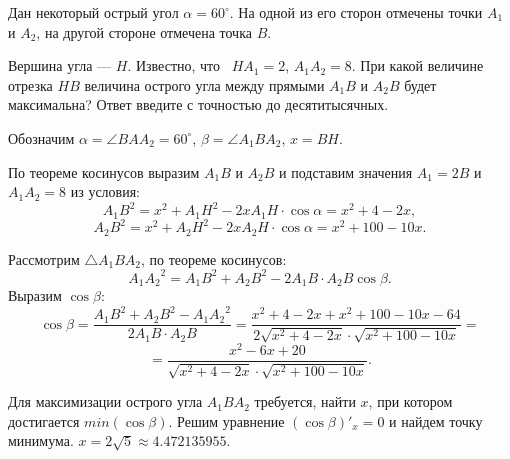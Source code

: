 
Дан некоторый острый угол $\alpha = 60^{\circ}$. На одной из его сторон отмечены точки $A_1$ и $A_2$, на другой стороне отмечена точка $B$. 

Вершина угла — $H$. Известно, что  $HA_1=2$, $A_1A_2=8$. При какой величине отрезка $HB$ величина острого угла между прямыми $A_1B$ и $A_2B$  будет максимальна? Ответ введите с точностью до десятитысячных.

\solutionSection

Обозначим $\alpha = \angle BAA_2=60^{\circ}$, $\beta = \angle A_1BA_2$, $x = BH$. 


По теореме косинусов выразим $A_1B$ и $A_2B$ и подставим значения $A_1 = 2B$ и $A_1A_2 = 8$ из условия:
$$A_1B^2 = x^2 + A_1H^2 - 2xA_1H\cdot \cos\alpha = x^2 + 4 - 2x,$$
$$A_2B^2 = x^2 + A_2H^2 - 2xA_2H\cdot \cos\alpha = x^2 + 100 - 10x.$$

Рассмотрим $\triangle A_1BA_2$, по теореме косинусов:
$${A_1A_2}^2 = A_1B^2 + A_2B^2 - 2A_1B\cdot A_2B \cos\beta.$$
Выразим $\cos\beta$:
$$\cos\beta = \frac{A_1B^2 + A_2B^2 - {A_1A_2}^2}{2A_1B\cdot A_2B} = \frac{x^2 + 4 - 2x + x^2 + 100 - 10x - 64}{2\sqrt{x^2 + 4 - 2x} \cdot \sqrt{x^2 + 100 - 10x}} =  $$
$$=\frac{x^2 - 6x + 20}{\sqrt{x^2 + 4 - 2x} \cdot \sqrt{x^2 + 100 - 10x}}.$$

Для максимизации острого угла $A_1BA_2$ требуется, найти $x$, при котором достигается $min(\cos\beta)$. Решим уравнение $(\cos\beta)'_x = 0$ и найдем точку минимума. $x = 2\sqrt{5} \approx 4.472135955$.

